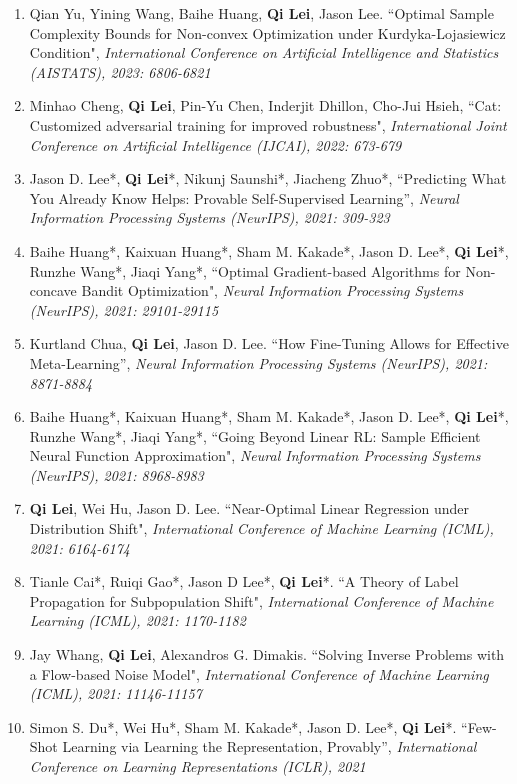 \documentclass[margin, 10pt]{res} %
\begin{document}
\begin{resume}
\begin{enumerate}
	\item{Qian Yu, Yining Wang, Baihe Huang, \textbf{Qi Lei}, Jason Lee. ``Optimal Sample Complexity Bounds for Non-convex Optimization under Kurdyka-Lojasiewicz Condition", \textit{International Conference on
			Artificial Intelligence and Statistics (AISTATS), 2023: 6806-6821}}
	

	
\item{Minhao Cheng, \textbf{Qi Lei}, Pin-Yu Chen, Inderjit Dhillon, Cho-Jui Hsieh, ``Cat: Customized adversarial training for improved robustness", \textit{International Joint Conference on Artificial Intelligence (IJCAI), 2022: 673-679}}
	
		\item {Jason D. Lee*, \textbf{Qi Lei}*, Nikunj Saunshi*, Jiacheng Zhuo*, ``Predicting What You Already Know Helps: Provable Self-Supervised Learning”, \textit{Neural Information Processing Systems (NeurIPS), 2021: 309-323}}


\item {Baihe Huang*, Kaixuan Huang*, Sham M. Kakade*, Jason D. Lee*, \textbf{Qi Lei}*, Runzhe Wang*, Jiaqi Yang*,  ``Optimal Gradient-based Algorithms for Non-concave Bandit Optimization", 	\textit{Neural Information Processing Systems (NeurIPS), 2021: 29101-29115} }


\item 	{ Kurtland Chua, \textbf{Qi Lei}, Jason D. Lee. ``How Fine-Tuning Allows for Effective Meta-Learning”, \textit{Neural Information Processing Systems (NeurIPS), 2021: 8871-8884} }



\item {Baihe Huang*, Kaixuan Huang*, Sham M. Kakade*, Jason D. Lee*, \textbf{Qi Lei}*, Runzhe Wang*, Jiaqi Yang*, ``Going Beyond Linear RL: Sample Efficient Neural Function Approximation", \textit{Neural Information Processing Systems (NeurIPS), 2021: 8968-8983} }
	
	
\item{ \textbf{Qi Lei}, Wei Hu, Jason D. Lee.	
``Near-Optimal Linear Regression under Distribution Shift", \textit{ International Conference of Machine Learning (ICML), 2021: 6164-6174}
}	
\item{Tianle Cai*, Ruiqi Gao*, Jason D Lee*, \textbf{Qi Lei}*.  ``A Theory of Label Propagation for Subpopulation Shift", \textit{International Conference of Machine Learning (ICML), 2021: 1170-1182
} }
\item{Jay Whang, \textbf{Qi Lei}, Alexandros G. Dimakis. ``Solving Inverse Problems with a Flow-based Noise Model", \textit{International Conference of Machine Learning (ICML), 2021: 11146-11157
 }}
	\item{Simon S. Du*, Wei Hu*, Sham M. Kakade*, Jason D. Lee*, \textbf{Qi Lei}*. ``Few-Shot Learning via Learning the Representation, Provably'', \textit{International Conference on Learning Representations (ICLR), 2021} }
	

\end{enumerate}
\end{resume}
\end{document}
